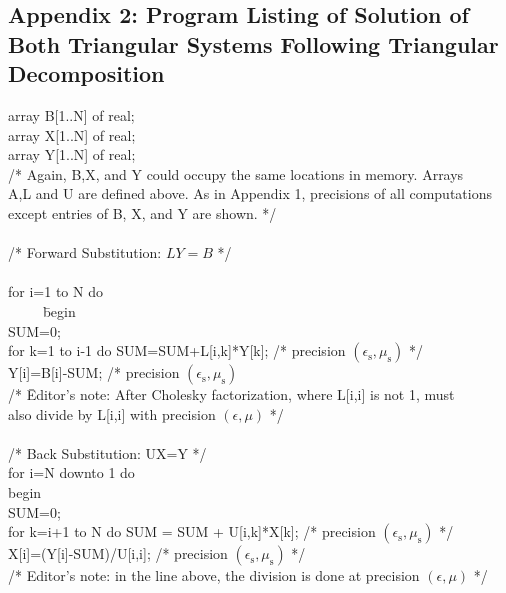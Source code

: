 \documentclass[a4paper]{article}
\begin{document}
\subsection*{Appendix 2: Program Listing of Solution of Both Triangular Systems Following
  Triangular Decomposition}

\begin{tabbing}
array B[1..N] of real;\\
array X[1..N] of real;\\
array Y[1..N] of real;\\
/* Again, B,X, and Y could occupy the same locations in memory. Arrays\\
A,L and U are defined above.  As in Appendix 1, precisions of all computations\\
except entries of B, X, and Y are shown. */\\
\\
/* Forward Substitution: $LY=B$ */\\
\\
for i=1 to N do\\
~~~~~\=begin\\
\>SUM=0;\\
\>for k=1 to i-1 do SUM=SUM+L[i,k]*Y[k]; /* precision $(\epsilon_\mathrm{s},\mu_\mathrm{s})$ */\\
\>Y[i]=B[i]-SUM; /* precision $(\epsilon_\mathrm{s},\mu_\mathrm{s})$\\
\>/* \=Editor's note: After Cholesky factorization, where L[i,i] is not 1, must\\
\>\>also divide by L[i,i] with precision $(\epsilon,\mu)$ */\\
\\
/* Back Substitution: UX=Y */\\
for i=N downto 1 do\\
\>begin\\
\>SUM=0;\\
\>for k=i+1 to N do SUM = SUM + U[i,k]*X[k]; /* precision $(\epsilon_\mathrm{s},\mu_\mathrm{s})$ */\\
\>X[i]=(Y[i]-SUM)/U[i,i]; /* precision  $(\epsilon_\mathrm{s},\mu_\mathrm{s})$ */\\
/* Editor's note: in the line above, the division is done at precision $(\epsilon,\mu)$ */\\
\end{tabbing}
\end{document}

